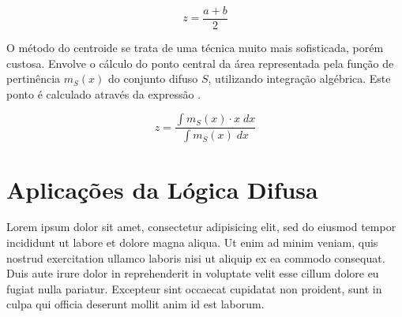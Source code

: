 \documentclass[12pt]{article}
\begin{document}
\begin{equation}
  \label{eq:mom}
  z = \frac{a + b}{2}
\end{equation}

O método do centroide se trata de uma técnica muito mais sofisticada, porém custosa. Envolve o cálculo do ponto central da área representada pela função de pertinência $m_{S}(x)$ do conjunto difuso $S$, utilizando integração algébrica. Este ponto é calculado através da expressão .

\begin{equation}
  \label{eq:centroid}
  z = \frac{\int m_{S}(x) \cdot x \; dx}{\int m_{S}(x) \; dx}
\end{equation}

\section{Aplicações da Lógica Difusa} \label{sec:applications}

Lorem ipsum dolor sit amet, consectetur adipisicing elit, sed do eiusmod tempor incididunt ut labore et dolore magna aliqua. Ut enim ad minim veniam, quis nostrud exercitation ullamco laboris nisi ut aliquip ex ea commodo consequat. Duis aute irure dolor in reprehenderit in voluptate velit esse cillum dolore eu fugiat nulla pariatur. Excepteur sint occaecat cupidatat non proident, sunt in culpa qui officia deserunt mollit anim id est laborum.



\end{document}
